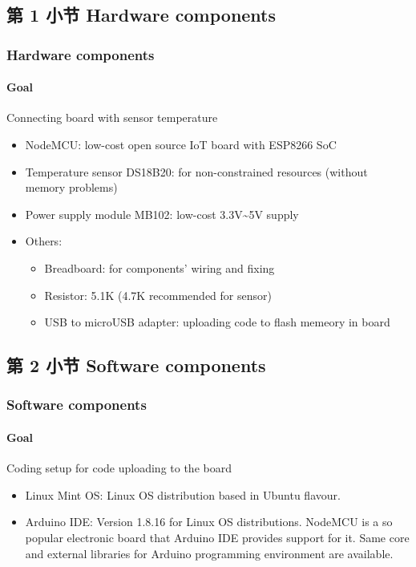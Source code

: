 \documentclass[
    aspectratio=169,                   %
]{beamer}
\begin{document}
\subsection{第 1 小节 Hardware components}

    \begin{frame}
        \frametitle{Hardware components}

        \paragraph{Goal} Connecting board with sensor temperature 

        \begin{itemize}
            \item \alert{NodeMCU\cite{nodemcu}}: low-cost open source IoT board with ESP8266 SoC
            \item \alert{Temperature sensor DS18B20\cite{ds18b20}}: for non-constrained resources (without memory problems)
            \item \alert{Power supply module MB102}: low-cost 3.3V\sim5V supply
            \item \alert{Others:}
            \begin{itemize}
                \item \alert{Breadboard}: for components' wiring and fixing
                \item \alert{Resistor}: 5.1K (4.7K recommended for sensor)
                \item \alert{USB to microUSB adapter}: uploading code to flash memeory in board      
            \end{itemize}
        \end{itemize}

    \end{frame}

\subsection{第 2 小节 Software components}

    \begin{frame}
        \frametitle{Software components}

        \paragraph{Goal} Coding setup for code uploading to the board

        \begin{itemize}
            \item \alert{Linux Mint OS}: Linux OS distribution based in Ubuntu flavour.
            \item \alert{Arduino IDE\cite{arduinoide}}: Version 1.8.16 for Linux OS distributions. NodeMCU is a so popular electronic board that Arduino IDE provides support for it. Same core and external libraries for Arduino programming environment are available.
        \end{itemize}

    \end{frame}
\end{document}
